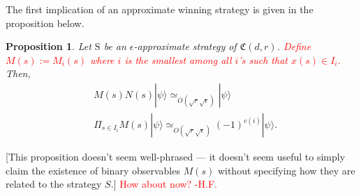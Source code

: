 \documentclass[11pt,letterpaper]{article}
\newcommand{\ket}[1]{|#1\rangle}
\newcommand{\1}{\mathbb{1}}
\newcommand{\fC}{\mathfrak{C}}
\newcommand{\bS}{\mathrm{S}}
\newcommand{\ep}{\epsilon}
\newcommand{\se}{\sqrt{\epsilon}}
\newcommand{\sr}{\sqrt{r}}
\newcommand{\appd}[1]{\simeq_{#1}}
\def\carl#1{{\color{blue} #1}}
\newcommand{\hf}[1]{\textcolor{red}{#1}}
\newcommand{\hfc}[1]{\textcolor{red}{#1 -H.F.}}
\newtheorem{proposition}[theorem]{Proposition}
\theoremstyle{definition}
\begin{document}
The first implication of an approximate winning strategy is given in the proposition below.
\begin{proposition}
	\label{prop:lct_base}
	Let $\bS$ be an $\ep$-approximate strategy of $\fC(d,r)$.
	\hf{Define $M(s) := M_i(s)$ where 
	$i$ is the smallest among all $i$'s
	such that $x(s) \in I_i$.}
	Then, 
	\begin{align}
		&M(s) N(s) \ket{\psi} \appd{O(\sr\se)} \ket{\psi} \\
		&\Pi_{s \in I_i} M(s) \ket{\psi} \appd{O(\sr\se)}(-1)^{c(i)} \ket{\psi}.
	\end{align}
\end{proposition}
\carl{[This proposition doesn't seem well-phrased --- it doesn't seem useful  to simply claim the existence of binary observables $M ( s )$ without specifying how they are related to the strategy $S$.]}
\hfc{How about now?}
\end{document}
